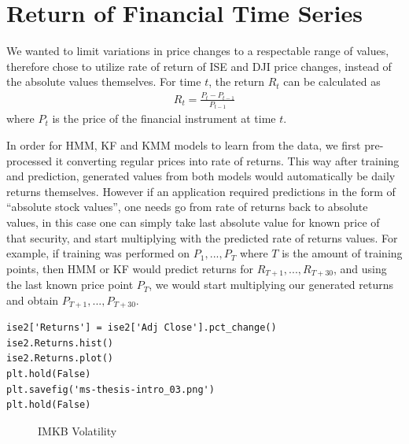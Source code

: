 \section{Return of Financial Time Series}

We wanted to limit variations in price changes to a respectable range of values,
therefore chose to utilize rate of return of ISE and DJI price changes, instead
of the absolute values themselves. For time $t$, the return $R_t$ can be
calculated as
\begin{eqnarray*}
R_t = \frac{P_t - P_{t-1}}{P_{t-1}}
\end{eqnarray*}
where $P_t$ is the price of the financial instrument at time $t$. 

In order for HMM, KF and KMM models to learn from the data, we first pre-processed it
converting regular prices into rate of returns. This way after training and
prediction, generated values from both models would automatically be daily
returns themselves. However if an application required predictions in the form
of ``absolute stock values'', one needs go from rate of returns back to absolute
values, in this case one can simply take last absolute value for known price of
that security, and start multiplying with the predicted rate of returns
values. For example, if training was performed on $P_1,...,P_T$ where $T$ is the
amount of training points, then HMM or KF would predict returns for
$R_{T+1},...,R_{T+30}$, and using the last known price point $P_T$, we would
start multiplying our generated returns and obtain $P_{T+1},...,P_{T+30}$.

\begin{verbatim}
ise2['Returns'] = ise2['Adj Close'].pct_change()
ise2.Returns.hist()
ise2.Returns.plot()
plt.hold(False)
plt.savefig('ms-thesis-intro_03.png')
plt.hold(False)
\end{verbatim}



\begin{figure}[!hbp]
\caption{IMKB Volatility}
\vspace{0.6cm}
\end{figure}


